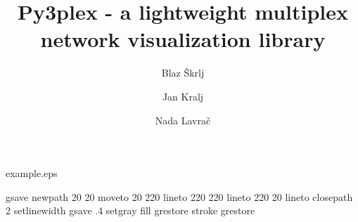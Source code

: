 %
%
%
%
%
\begin{filecontents*}{example.eps}
\usepackage[numbers, square, sectionbib]{natbib}

gsave
newpath
  20 20 moveto
  20 220 lineto
  220 220 lineto
  220 20 lineto
closepath
2 setlinewidth
gsave
  .4 setgray fill
grestore
stroke
grestore
\end{filecontents*}
%
\RequirePackage{fix-cm}
%
\documentclass[smallextended]{svjour3}       %
%
\smartqed  %
%
\usepackage{graphicx}
\usepackage{apalike}
%
%
%
%
%


\title{Py3plex - a lightweight multiplex network visualization library}


\author{Blaz \v{S}krlj         \and
        Jan Kralj \and
        Nada Lavra\v{c}
}


